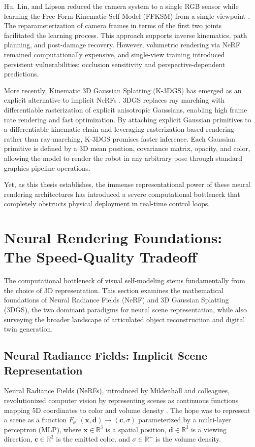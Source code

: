 \documentclass[12pt,a4paper,oneside]{report}
\begin{document}
Hu, Lin, and Lipson reduced the camera system to a single RGB sensor while learning the Free-Form Kinematic Self-Model (FFKSM) from a single viewpoint \cite{hu2024teaching}. The reparameterization of camera frames in terms of the first two joints facilitated the learning process. This approach supports inverse kinematics, path planning, and post-damage recovery. However, volumetric rendering via NeRF remained computationally expensive, and single-view training introduced persistent vulnerabilities: occlusion sensitivity and perspective-dependent predictions.

More recently, Kinematic 3D Gaussian Splatting (K-3DGS) has emerged as an explicit alternative to implicit NeRFs \cite{hu2025learning}. 3DGS replaces ray marching with differentiable rasterization of explicit anisotropic Gaussians, enabling high frame rate rendering and fast optimization. By attaching explicit Gaussian primitives to a differentiable kinematic chain and leveraging rasterization-based rendering rather than ray-marching, K-3DGS promises faster inference. Each Gaussian primitive is defined by a 3D mean position, covariance matrix, opacity, and color, allowing the model to render the robot in any arbitrary pose through standard graphics pipeline operations.

Yet, as this thesis establishes, the immense representational power of these neural rendering architectures has introduced a severe computational bottleneck that completely obstructs physical deployment in real-time control loops.
\section{Neural Rendering Foundations: The Speed-Quality Tradeoff}

The computational bottleneck of visual self-modeling stems fundamentally from the choice of 3D representation. This section examines the mathematical foundations of Neural Radiance Fields (NeRF) and 3D Gaussian Splatting (3DGS), the two dominant paradigms for neural scene representation, while also surveying the broader landscape of articulated object reconstruction and digital twin generation.
\subsection{Neural Radiance Fields: Implicit Scene Representation}
\label{subsec:neural_radiance_fields_implicit_scene_representation}

Neural Radiance Fields (NeRFs), introduced by Mildenhall and colleagues, revolutionized computer vision by representing scenes as continuous functions mapping 5D coordinates to color and volume density \cite{mildenhall2020nerf}. The hope was to represent a scene as a function $F_\theta: (\mathbf{x}, \mathbf{d}) \rightarrow (\mathbf{c}, \sigma)$ parameterized by a multi-layer perceptron (MLP), where $\mathbf{x} \in \mathbb{R}^3$ is a spatial position, $\mathbf{d} \in \mathbb{R}^3$ is a viewing direction, $\mathbf{c} \in \mathbb{R}^3$ is the emitted color, and $\sigma \in \mathbb{R}^+$ is the volume density.
\end{document}
